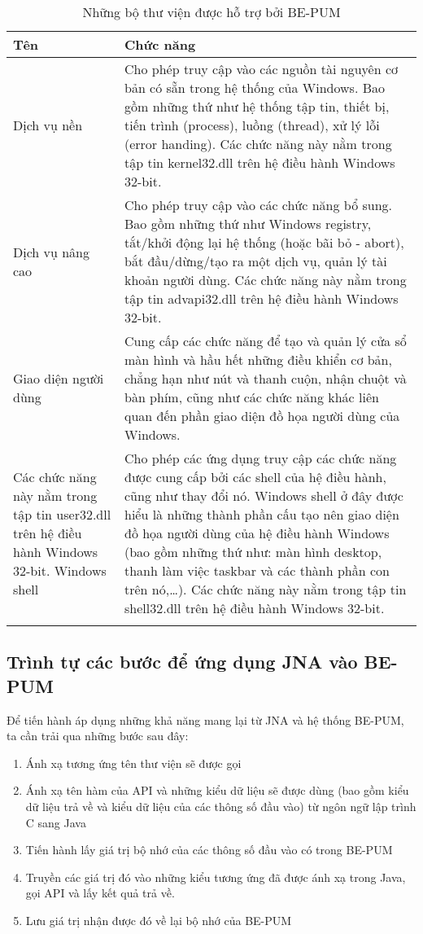 \begin{longtable}{ | m{3cm} | m{11cm} | }
	\hline
Tên & Chức năng\\
	\hline
	\hline
Dịch vụ nền & Cho phép truy cập vào các nguồn tài nguyên cơ bản có sẵn trong hệ thống của Windows. Bao gồm những thứ như hệ thống tập tin, thiết bị, tiến trình (process), luồng (thread), xử lý lỗi (error handing).
Các chức năng này nằm trong tập tin kernel32.dll trên hệ điều hành Windows 32-bit.\\
	\hline
Dịch vụ nâng cao & Cho phép truy cập vào các chức năng bổ sung. Bao gồm những thứ như Windows registry, tắt/khởi động lại hệ thống (hoặc bãi bỏ - abort), bắt đầu/dừng/tạo ra một dịch vụ, quản lý tài khoản người dùng.
Các chức năng này nằm trong tập tin advapi32.dll trên hệ điều hành Windows 32-bit.\\
	\hline
Giao diện người dùng & Cung cấp các chức năng để tạo và quản lý cửa sổ màn hình và hầu hết những điều khiển cơ bản, chẳng hạn như nút và thanh cuộn, nhận chuột và bàn phím, cũng như các chức năng khác liên quan đến phần giao diện đồ họa người dùng của Windows.\\
	\hline
Các chức năng này nằm trong tập tin user32.dll trên hệ điều hành Windows 32-bit.
Windows shell & Cho phép các ứng dụng truy cập các chức năng được cung cấp bởi các shell của hệ điều hành, cũng như thay đổi nó.
Windows shell ở đây được hiểu là những thành phần cấu tạo nên giao diện đồ họa người dùng của hệ điều hành Windows (bao gồm những thứ như: màn hình desktop, thanh làm việc taskbar và các thành phần con trên nó,…).
Các chức năng này nằm trong tập tin shell32.dll trên hệ điều hành Windows 32-bit.\\
	\hline

\caption[Những bộ thư viện được hỗ trợ bởi BE-PUM]{Những bộ thư viện được hỗ trợ bởi BE-PUM}
\label{table:tblwapilib}
\end{longtable}


	\subsection{Trình tự các bước để ứng dụng JNA vào BE-PUM}

Để  tiến hành áp dụng những khả năng mang lại từ JNA và hệ thống BE-PUM, ta cần trải qua những bước sau đây:
\begin{enumerate}
	\item Ánh xạ tương ứng tên thư viện sẽ được gọi
	\item Ánh xạ tên hàm của API và những kiểu dữ liệu sẽ được dùng (bao gồm kiểu dữ liệu trả về và kiểu dữ liệu của các thông số đầu vào) từ ngôn ngữ lập trình C sang Java
	\item Tiến hành lấy giá trị bộ nhớ của các thông số đầu vào có trong BE-PUM
	\item Truyền các giá trị đó vào những kiểu tương ứng đã được ánh xạ trong Java, gọi API và lấy kết quả trả về.
	\item Lưu giá trị nhận được đó về lại bộ nhớ của BE-PUM
\end{enumerate}


